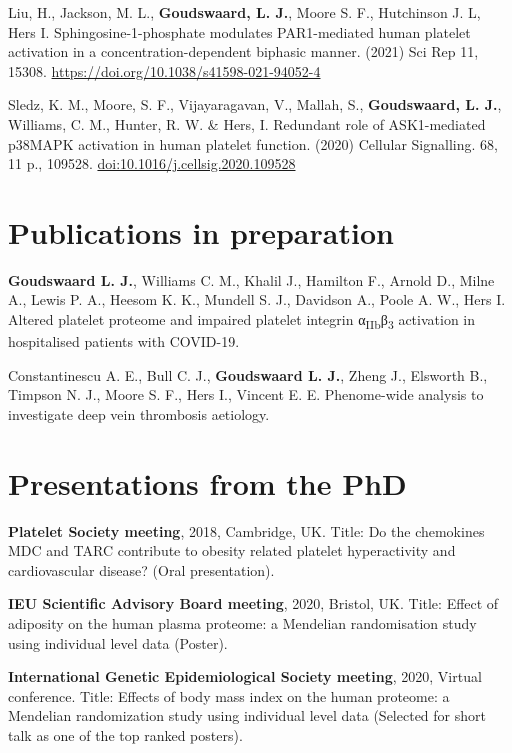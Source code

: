 \documentclass[11pt,twoside]{bristolthesis}
\begin{document}
Liu, H., Jackson, M. L., \textbf{Goudswaard, L. J.}, Moore S. F., Hutchinson J. L, Hers I. Sphingosine-1-phosphate modulates PAR1-mediated human platelet activation in a concentration-dependent biphasic manner. (2021) Sci Rep 11, 15308. \url{https://doi.org/10.1038/s41598-021-94052-4}

Sledz, K. M., Moore, S. F., Vijayaragavan, V., Mallah, S., \textbf{Goudswaard, L. J.}, Williams, C. M., Hunter, R. W. \& Hers, I. Redundant role of ASK1-mediated p38MAPK activation in human platelet function. (2020) Cellular Signalling. 68, 11 p., 109528. \url{doi:10.1016/j.cellsig.2020.109528}

\hypertarget{publications-in-preparation}{%
\section{Publications in preparation}\label{publications-in-preparation}}

\textbf{Goudswaard L. J.}, Williams C. M., Khalil J., Hamilton F., Arnold D., Milne A., Lewis P. A., Heesom K. K., Mundell S. J., Davidson A., Poole A. W., Hers I. Altered platelet proteome and impaired platelet integrin α\textsubscript{IIb}β\textsubscript{3} activation in hospitalised patients with COVID-19.

Constantinescu A. E., Bull C. J., \textbf{Goudswaard L. J.}, Zheng J., Elsworth B., Timpson N. J., Moore S. F., Hers I., Vincent E. E. Phenome-wide analysis to investigate deep vein thrombosis aetiology.

\hypertarget{presentations-from-the-phd}{%
\section{Presentations from the PhD}\label{presentations-from-the-phd}}

\textbf{Platelet Society meeting}, 2018, Cambridge, UK. Title: Do the chemokines MDC and TARC contribute to obesity related platelet hyperactivity and cardiovascular disease? (Oral presentation).

\textbf{IEU Scientific Advisory Board meeting}, 2020, Bristol, UK. Title: Effect of adiposity on the human plasma proteome: a Mendelian randomisation study using individual level data (Poster).

\textbf{International Genetic Epidemiological Society meeting}, 2020, Virtual conference. Title: Effects of body mass index on the human proteome: a Mendelian randomization study using individual level data (Selected for short talk as one of the top ranked posters).
\end{document}
